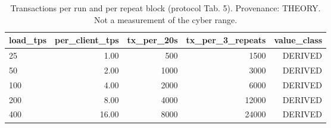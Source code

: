 \begin{table}[t]
\caption{Transactions per run and per repeat block (protocol Tab. 5). Provenance: THEORY.  Not a measurement of the cyber range.}
\label{tab:table05_tx_per_run}
\centering
\begin{tabular}{lrrrr}
\hline
load\_tps & per\_client\_tps & tx\_per\_20s & tx\_per\_3\_repeats & value\_class \\
\hline
25 & 1.00 & 500 & 1500 & DERIVED \\
50 & 2.00 & 1000 & 3000 & DERIVED \\
100 & 4.00 & 2000 & 6000 & DERIVED \\
200 & 8.00 & 4000 & 12000 & DERIVED \\
400 & 16.00 & 8000 & 24000 & DERIVED \\
\hline
\end{tabular}
\end{table}
